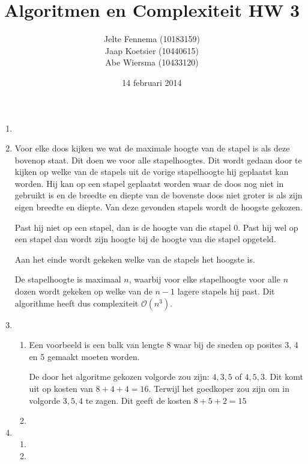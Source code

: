 \documentclass[11pt]{article}
\title{\textbf{Algoritmen en Complexiteit HW 3}}
\author{Jelte Fennema (10183159)\\
		Jaap Koetsier (10440615)\\
        Abe Wiersma (10433120)}
\date{14 februari 2014}
\newcommand{\bigO}{\ensuremath{\mathcal{O}}}
\begin{document}
\maketitle

\begin{enumerate}
    \item

    \item
        Voor elke doos kijken we wat de maximale hoogte van de stapel is als
        deze bovenop staat. Dit doen we voor alle stapelhoogtes. Dit wordt
        gedaan door te kijken op welke van de stapels uit de vorige stapelhoogte
        hij geplaatst kan worden. Hij kan op een stapel geplaatst worden waar de
        doos nog niet in gebruikt is en de breedte en diepte van de bovenste
        doos niet groter is als zijn eigen breedte en diepte. Van deze gevonden
        stapels wordt de hoogste gekozen.

        Past hij niet op een stapel, dan is de hoogte van die stapel 0. Past hij
        wel op een stapel dan wordt zijn hoogte bij de hoogte van die stapel
        opgeteld.

        Aan het einde wordt gekeken welke van de stapels het hoogste is.

        De stapelhoogte is maximaal $n$, waarbij voor elke stapelhoogte voor
        alle $n$ dozen wordt gekeken op welke van de $n - 1$ lagere stapels hij
        past. Dit algorithme heeft dus complexiteit \bigO$(n^3)$.

    \item
        \begin{enumerate}
            \item
                Een voorbeeld is een balk van lengte 8 waar bij de sneden op
                posites 3, 4 en 5 gemaakt moeten worden.

                De door het algoritme gekozen volgorde zou zijn: $4, 3, 5$ of
                $4, 5, 3$. Dit komt uit op kosten van $8+4+4=16$. Terwijl het
                goedkoper zou zijn om in volgorde $3, 5, 4$ te zagen. Dit geeft
                de kosten $8+5+2=15$

            \item
        \end{enumerate}

    \item
        \begin{enumerate}
            \item
            \item
        \end{enumerate}

\end{enumerate}
\end{document}
